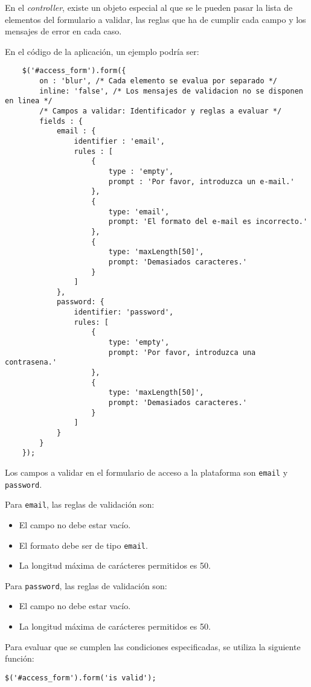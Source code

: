 En el \textit{controller}, existe un objeto especial al que se le pueden pasar la lista de elementos del formulario a validar, las reglas que ha de cumplir cada campo y los mensajes de error en cada caso.


En el código de la aplicación, un ejemplo podría ser:


\medskip
\begin{lstlisting}
	$('#access_form').form({ 
		on : 'blur', /* Cada elemento se evalua por separado */ 
		inline: 'false', /* Los mensajes de validacion no se disponen en linea */ 
		/* Campos a validar: Identificador y reglas a evaluar */ 
		fields : { 
			email : { 
				identifier : 'email', 
				rules : [ 
					{ 
						type : 'empty', 
						prompt : 'Por favor, introduzca un e-mail.' 
					}, 
					{ 
						type: 'email', 
						prompt: 'El formato del e-mail es incorrecto.' 
					}, 
					{ 
						type: 'maxLength[50]', 
						prompt: 'Demasiados caracteres.' 
					} 
				] 
			},      
			password: { 
				identifier: 'password', 
				rules: [ 
					{ 
						type: 'empty', 
						prompt: 'Por favor, introduzca una contrasena.' 
					}, 
					{ 
						type: 'maxLength[50]', 
						prompt: 'Demasiados caracteres.' 
					} 
				] 
			} 
		} 
	}); 
\end{lstlisting}

Los campos a validar en el formulario de acceso a la plataforma son \texttt{email} y \texttt{password}.


Para \texttt{email}, las reglas de validación son:
\begin{itemize}
\item El campo no debe estar vacío.
\item El formato debe ser de tipo \texttt{email}.
\item La longitud máxima de carácteres permitidos es 50.
\end{itemize}


Para \texttt{password}, las reglas de validación son:
\begin{itemize}
\item El campo no debe estar vacío.
\item La longitud máxima de carácteres permitidos es 50.
\end{itemize}


Para evaluar que se cumplen las condiciones especificadas, se utiliza la siguiente función:


\medskip
\begin{lstlisting}
$('#access_form').form('is valid');
\end{lstlisting}


